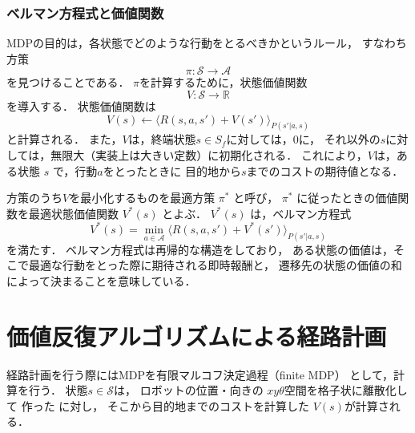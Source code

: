 \subsubsection{ベルマン方程式と価値関数}
MDPの目的は，各状態でどのような行動をとるべきかというルール，
すなわち方策
\begin{equation}
\pi: \mathcal{S} \to \mathcal{A}
\end{equation}
を見つけることである．
$\pi$を計算するために，状態価値関数 
\begin{equation}
V: \mathcal{S} \to \mathbb{R}
\end{equation}
を導入する．
状態価値関数は
\begin{equation}
    V(s) \leftarrow \bigg\langle R(s, a, s') + V(s') \bigg\rangle_{P(s'| a, s)}
  \label{eq:value_func_def}
\end{equation}
と計算される．%
また，$V$は，終端状態$s \in S_f$に対しては，0に，
それ以外の$s$に対しては，無限大（実装上は大きい定数）に初期化される．
これにより，$V$は，ある状態 $s$ で，行動$a$をとったときに
目的地から$s$までのコストの期待値となる．

方策のうち$V$を最小化するものを最適方策 $\pi^*$ と呼び，
$\pi^*$ に従ったときの価値関数を最適状態価値関数 $V^*(s)$ とよぶ．
$V^*(s)$ は，ベルマン方程式
\begin{equation}
    V^*(s) = \min_{a \in \mathcal{A}} 
    \bigg\langle R(s, a, s') + V^*(s') \bigg\rangle_{P(s'| a, s)}
    \label{eq:bellman_formula2}
\end{equation}
を満たす．
ベルマン方程式は再帰的な構造をしており，
ある状態の価値は，そこで最適な行動をとった際に期待される即時報酬と，
遷移先の状態の価値の和によって決まることを意味している．




\section{価値反復アルゴリズムによる経路計画}
経路計画を行う際にはMDPを有限マルコフ決定過程（finite MDP）
として，計算を行う．
状態$s \in \mathcal{S}$は，
ロボットの位置・向きの
$xy\theta$空間を格子状に離散化して
作った
に対し，
そこから目的地までのコストを計算した
$V(s)$が計算される．

